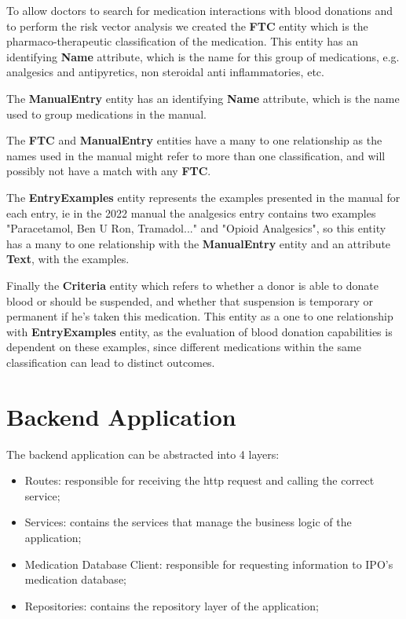 To allow doctors to search for medication interactions with blood donations and to perform the risk vector analysis we created the \textbf{FTC} entity which is the pharmaco-therapeutic classification of the medication.
This entity has an identifying \textbf{Name} attribute, which is the name for this group of medications, e.g. analgesics and antipyretics, non steroidal anti inflammatories, etc.

The \textbf{ManualEntry} entity has an identifying \textbf{Name} attribute, which is the name used to group medications in the manual.

The \textbf{FTC} and \textbf{ManualEntry} entities have a many to one relationship as the names used in the manual might refer to more than one classification, and will possibly not have a match with any \textbf{FTC}.

The \textbf{EntryExamples} entity represents the examples presented in the manual for each entry, ie in the 2022 manual the analgesics entry contains two examples "Paracetamol, Ben U Ron, Tramadol..." and "Opioid Analgesics", so this entity has a many to one relationship with the \textbf{ManualEntry} entity and an attribute \textbf{Text}, with the examples.

Finally the \textbf{Criteria} entity which refers to whether a donor is able to donate blood or should be suspended, and whether that suspension is temporary or permanent if he's taken this medication. This entity as a one to one relationship with \textbf{EntryExamples} entity, as the evaluation of blood donation capabilities is dependent on these examples, since different medications within the same classification can lead to distinct outcomes.














\section{Backend Application}

The backend application can be abstracted into 4 layers:
\begin{itemize}
	\item Routes: responsible for receiving the http request and calling the correct service;
	\item Services: contains the services that manage the business logic of the application;
	\item Medication Database Client: responsible for requesting information to IPO's medication database;
	\item Repositories: contains the repository layer of the application;
\end{itemize}

